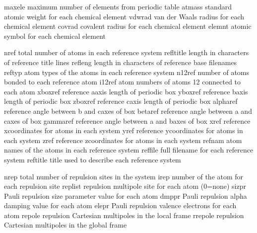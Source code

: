 \documentclass[letterpaper,11pt,english]{sphinxmanual}
\begin{document}
\sphinxAtStartPar
{}

\begin{sphinxVerbatim}[commandchars=\\\{\}]
maxele          maximum number of elements from periodic table
atmass          standard atomic weight for each chemical element
vdwrad          van der Waals radius for each chemical element
covrad          covalent radius for each chemical element
elemnt          atomic symbol for each chemical element
\end{sphinxVerbatim}

\sphinxAtStartPar
{}

\begin{sphinxVerbatim}[commandchars=\\\{\}]
nref            total number of atoms in each reference system
refltitle       length in characters of reference title lines
refleng         length in characters of reference base filenames
reftyp          atom types of the atoms in each reference system
n12ref          number of atoms bonded to each reference atom
i12ref          atom numbers of atoms 1\PYGZhy{}2 connected to each atom
xboxref         reference a\PYGZhy{}axis length of periodic box
yboxref         reference b\PYGZhy{}axis length of periodic box
zboxref         reference c\PYGZhy{}axis length of periodic box
alpharef        reference angle between b\PYGZhy{} and c\PYGZhy{}axes of box
betaref         reference angle between a\PYGZhy{} and c\PYGZhy{}axes of box
gammaref        reference angle between a\PYGZhy{} and b\PYGZhy{}axes of box
xref            reference x\PYGZhy{}coordinates for atoms in each system
yref            reference y\PYGZhy{}coordinates for atoms in each system
zref            reference z\PYGZhy{}coordinates for atoms in each system
refnam          atom names of the atoms in each reference system
reffile         full filename for each reference system
reftitle        title used to describe each reference system
\end{sphinxVerbatim}

\sphinxAtStartPar
{}

\begin{sphinxVerbatim}[commandchars=\\\{\}]
nrep            total number of repulsion sites in the system
irep            number of the atom for each repulsion site
replist         repulsion multipole site for each atom (0=none)
sizpr           Pauli repulsion size parameter value for each atom
dmppr           Pauli repulsion alpha damping value for each atom
elepr           Pauli repulsion valence electrons for each atom
repole          repulsion Cartesian multipoles in the local frame
rrepole         repulsion Cartesian multipoles in the global frame
\end{sphinxVerbatim}
\end{document}

